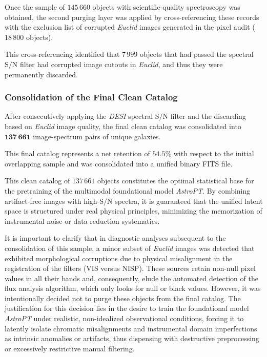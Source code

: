 Once the sample of $145\,660$ objects with scientific-quality spectroscopy was obtained, the second purging layer was applied by cross-referencing these records with the exclusion list of corrupted \textit{Euclid} images generated in the pixel audit ($18\,800$ objects).

This cross-referencing identified that $7\,999$ objects that had passed the spectral $\text{S/N}$ filter had corrupted image cutouts in \textit{Euclid}, and thus they were permanently discarded.

\subsubsection{Consolidation of the Final Clean Catalog}

After consecutively applying the \textit{\gls{DESI}} spectral $\text{S/N}$ filter and the discarding based on \textit{Euclid} image quality, the final clean catalog was consolidated into $\mathbf{137\,661}$ image-spectrum pairs of unique galaxies.

This final catalog represents a net retention of $54.5\%$ with respect to the initial overlapping sample and was consolidated into a unified binary FITS file.

This clean catalog of $137\,661$ objects constitutes the optimal statistical base for the pretraining of the multimodal foundational model \textit{AstroPT}. By combining artifact-free images with high-$\text{S/N}$ spectra, it is guaranteed that the unified latent space is structured under real physical principles, minimizing the memorization of instrumental noise or data reduction systematics.

It is important to clarify that in diagnostic analyses subsequent to the consolidation of this sample, a minor subset of \textit{Euclid} images was detected that exhibited morphological corruptions due to physical misalignment in the registration of the filters (VIS versus NISP). These sources retain non-null pixel values in all their bands and, consequently, elude the automated detection of the flux analysis algorithm, which only looks for null or black values. However, it was intentionally decided not to purge these objects from the final catalog. The justification for this decision lies in the desire to train the foundational model \textit{AstroPT} under realistic, non-idealized observational conditions, forcing it to latently isolate chromatic misalignments and instrumental domain imperfections as intrinsic anomalies or artifacts, thus dispensing with destructive preprocessing or excessively restrictive manual filtering.
